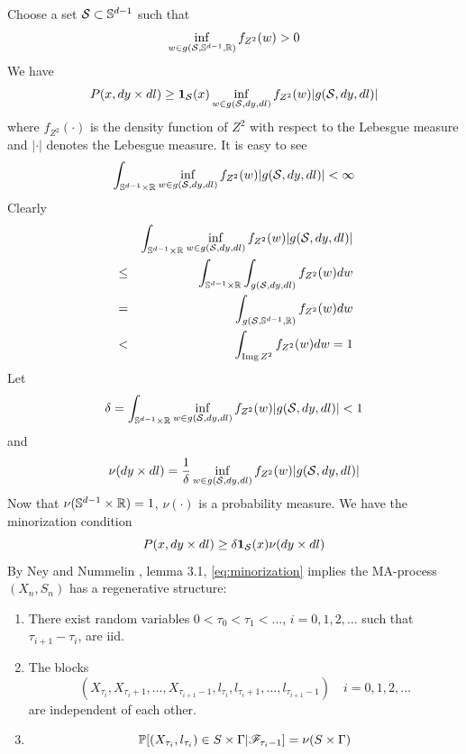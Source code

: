 \documentclass[aoas,preprint]{imsart}
\numberwithin{equation}{section}
\theoremstyle{plain}
\begin{document}
Choose a set $\mathcal S \subset \sphere^{d-1}$ such that
\[
\inf_{w \in g(\mathcal S, \sphere^{d-1}, \reals)} f_{Z^2}(w) > 0
\]
We have
\begin{eqnarray*}
  P(x, dy \times dl) \geq
  \I_{\mathcal S}(x) \inf_{w \in g(\mathcal S, dy, dl)} f_{Z^2}(w)
  | g(\mathcal S, dy, dl)| 
\end{eqnarray*}
where $f_{Z^2}(\cdot)$ is the density function of $Z^2$ with respect to the
Lebesgue measure and $|\cdot|$ denotes the Lebesgue measure. It is
easy to see
\[
\int_{\sphere^{d-1} \times \reals} \inf_{w \in g(\mathcal S, dy, dl)} f_{Z^2}(w)
| g(\mathcal S, dy, dl)| < \infty
\]
Clearly
\begin{eqnarray*}
  &&
  \int_{\sphere^{d-1} \times \reals} \inf_{w \in g(\mathcal S, dy, dl)} f_{Z^2}(w)
  | g(\mathcal S, dy, dl)| \\
  &\leq&
  \int_{\sphere^{d-1} \times \reals}
  \int_{g(\mathcal S, dy, dl)} f_{Z^2}(w) dw \\
  &=&
  \int_{g(\mathcal S, \sphere^{d-1}, \reals)} f_{Z^2}(w) dw \\
  &<&
  \int_{\img Z^2} f_{Z^2}(w) dw = 1
\end{eqnarray*}
Let
\[
\delta = \int_{\sphere^{d-1} \times \reals}
\inf_{w \in g(\mathcal S, dy, dl)} f_{Z^2}(w)
| g(\mathcal S, dy, dl)| < 1
\]
and
\[
\nu(dy \times dl) = {1 \over \delta}
\inf_{w \in g(\mathcal S, dy, dl)} f_{Z^2}(w)
| g(\mathcal S, dy, dl)|
\]
Now that $\nu(\sphere^{d-1} \times \reals) = 1$, $\nu(\cdot)$ is a
probability measure. We have the minorization condition
\begin{equation}
  \label{eq:minorization}
  P(x, dy \times dl) \geq \delta \I_{\mathcal S}(x) \nu(dy \times dl)
\end{equation}
By Ney and Nummelin \cite{ney:nummelin:1987}, lemma 3.1,
\eqref{eq:minorization} implies the MA-process $(X_n, S_n)$ has a
regenerative structure:
\begin{enumerate}[(1)]
\item There exist random variables $0 < \tau_0 < \tau_1 < \dots$,
  $i = 0, 1, 2, \dots$ such that $\tau_{i+1} - \tau_i$,  are iid.
\item The blocks
  \[
  (X_{\tau_i}, X_{\tau_i + 1}, \dots, X_{\tau_{i+1} - 1}, l_{\tau_i},
  l_{\tau_i + 1}, \dots, l_{\tau_{i+1} - 1}) \quad
  i = 0, 1, 2, \dots
  \]
  are independent of each other.
\item
  \[
  \P[(X_{\tau_i}, l_{\tau_i}) \in S \times \Gamma | \mathscr F_{\tau_i - 1}]
  = \nu(S \times \Gamma)
  \]
\end{enumerate}
\end{document}
